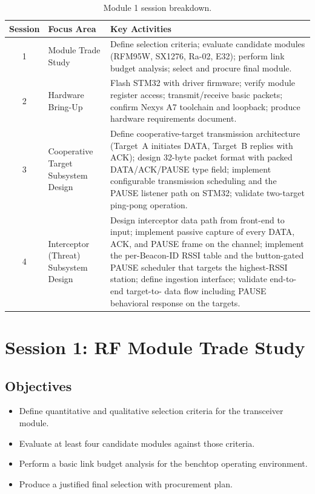 \documentclass[11pt,letterpaper]{article}
\begin{document}
	\begin{table}[ht!]
		\centering
		\caption{Module 1 session breakdown.}
		\label{tab:schedule}
		\renewcommand{\arraystretch}{1.4}
		\begin{tabularx}{\textwidth}{c l X}
			\toprule
			\textbf{Session} & \textbf{Focus Area} & \textbf{Key Activities} \\
			\midrule
			1 & \RF{} Module Trade Study &
			Define selection criteria; evaluate candidate modules (RFM95W, SX1276, Ra-02, E32); perform link budget analysis; select and procure final module. \\
			2 & Hardware Bring-Up &
			Flash STM32 with \SPI{} driver firmware; verify \RF{} module register access; transmit/receive basic packets; confirm Nexys A7 toolchain and loopback; produce hardware requirements document. \\
			3 & Cooperative Target Subsystem Design &
			Define cooperative-target transmission architecture (Target~A initiates DATA, Target~B replies with ACK); design 32-byte packet format with packed DATA/ACK/PAUSE type field; implement configurable transmission scheduling and the PAUSE listener path on STM32; validate two-target ping-pong operation. \\
			4 & Interceptor (Threat) Subsystem Design &
			Design interceptor data path from \RF{} front-end to \FPGA{} input; implement passive capture of every DATA, ACK, and PAUSE frame on the channel; implement the per-Beacon-ID RSSI table and the button-gated PAUSE scheduler that targets the highest-RSSI station; define \FPGA{} ingestion interface; validate end-to-end target-to-\FPGA{} data flow including PAUSE behavioral response on the targets. \\
			\bottomrule
		\end{tabularx}
	\end{table}
	
	\newpage
	\section{Session 1: RF Module Trade Study}
	\label{sec:tradestudy}
	
	\subsection{Objectives}
	
	\begin{itemize}[leftmargin=2em]
		\item Define quantitative and qualitative selection criteria for the \RF{} transceiver module.
		\item Evaluate at least four candidate modules against those criteria.
		\item Perform a basic link budget analysis for the benchtop operating environment.
		\item Produce a justified final selection with procurement plan.
	\end{itemize}
	
\end{document}
